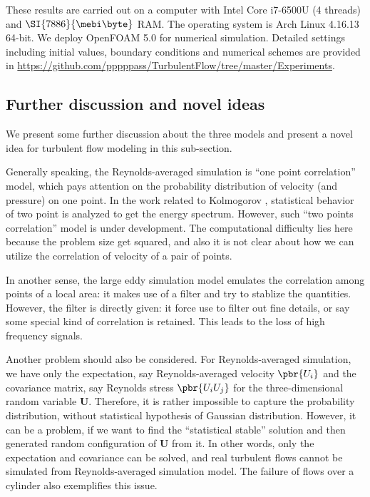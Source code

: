 \documentclass[english, nochinese]{pkupaper}
\begin{document}
These results are carried out on a computer with Intel Core i7-6500U (4 threads) and $\SI{7886}{\mebi\byte}$ RAM. The operating system is Arch Linux 4.16.13 64-bit. We deploy OpenFOAM 5.0 \parencite{weller_tensorial_1998} for numerical simulation. Detailed settings including initial values, boundary conditions and numerical schemes are provided in \url{https://github.com/pppppass/TurbulentFlow/tree/master/Experiments}.

\subsection{Further discussion and novel ideas}

We present some further discussion about the three models and present a novel idea for turbulent flow modeling in this sub-section.

Generally speaking, the Reynolds-averaged simulation is ``one point correlation'' model, which pays attention on the probability distribution of velocity (and pressure) on one point. In the work related to Kolmogorov \parencite{kolmogorov_equations_1941} \parencite{sreenivasan_universality_1995} \parencite{pope_turbulent_2001}, statistical behavior of two point is analyzed to get the energy spectrum. However, such ``two points correlation'' model is under development. The computational difficulty lies here because the problem size get squared, and also it is not clear about how we can utilize the correlation of velocity of a pair of points.

In another sense, the large eddy simulation model emulates the correlation among points of a local area: it makes use of a filter and try to stablize the quantities. However, the filter is directly given: it force use to filter out fine details, or say some special kind of correlation is retained. This leads to the loss of high frequency signals.

Another problem should also be considered. For Reynolds-averaged simulation, we have only the expectation, say Reynolds-averaged velocity $\pbr{U_i}$ and the covariance matrix, say Reynolds stress $ \pbr{ U_i U_j } $ for the three-dimensional random variable $\mathbf{U}$. Therefore, it is rather impossible to capture the probability distribution, without statistical hypothesis of Gaussian distribution. However, it can be a problem, if we want to find the ``statistical stable'' solution and then generated random configuration of $\mathbf{U}$ from it. In other words, only the expectation and covariance can be solved, and real turbulent flows cannot be simulated from Reynolds-averaged simulation model. The failure of flows over a cylinder also exemplifies this issue.
\end{document}
